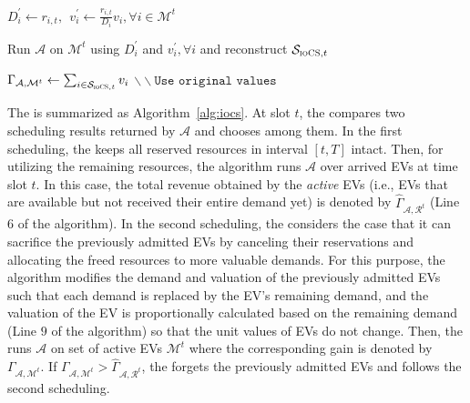 \begin{algorithm}
$D_i^\prime\leftarrow r_{i,t},\ \ v_i^\prime\leftarrow \frac{r_{i,t}}{D_i}v_i, \forall i\in\mathcal{M}^t$


Run $\mathcal{A}$ on $\mathcal{M}^t$ using $D_i^\prime$ and $v_i^\prime, \forall i$ and reconstruct $\mathcal{S}_{\textsc{ioCS},t}$

$\Gamma_{\mathcal{A},\mathcal{M}^t}\leftarrow \sum_{i\in\mathcal{S}_{\textsc{ioCS},t}}v_i$ $\backslash\backslash\texttt{Use original values}$




\end{algorithm}

The \iocs is summarized as Algorithm~\ref{alg:iocs}. At slot $t$, the \iocs compares two scheduling results returned by $\mathcal{A}$ and chooses among them. In the first scheduling, the \iocs keeps all reserved resources in interval $[t,T]$ intact. Then, for utilizing the remaining resources, the algorithm runs $\mathcal{A}$ over arrived EVs at time slot $t$. In this case, the total revenue obtained by the \emph{active} EVs (i.e., EVs that are available but not received their entire demand yet) is denoted by $\widehat{\Gamma}_{\mathcal{A},\mathcal{R}^t}$ (Line $6$ of the algorithm). In the second scheduling, the \iocs considers the case that it can sacrifice the previously admitted EVs by canceling their reservations and allocating the freed resources to more valuable demands. For this purpose, the algorithm modifies the demand and valuation of the previously admitted EVs such that each demand is replaced by the EV's remaining demand, and the valuation of the EV is proportionally calculated based on the remaining demand (Line $9$ of the algorithm) so that the unit values of EVs do not change. Then, the \iocs runs $\mathcal{A}$ on set of active EVs $\mathcal{M}^t$ where the corresponding gain is denoted by $\Gamma_{\mathcal{A},\mathcal{M}^t}$. If $\Gamma_{\mathcal{A},\mathcal{M}^t}>\widehat{\Gamma}_{\mathcal{A},\mathcal{R}^t}$, the \iocs forgets the previously admitted EVs and follows the second scheduling. 



